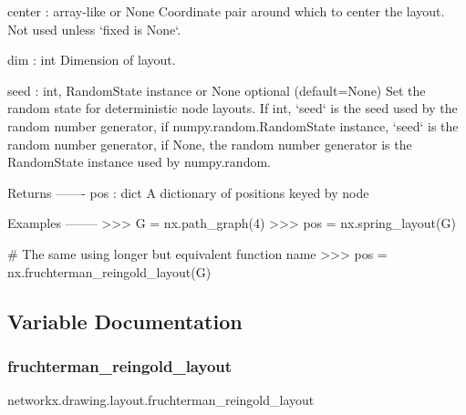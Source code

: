 \begin{DoxyVerb}
center : array-like or None
    Coordinate pair around which to center the layout.
    Not used unless `fixed is None`.

dim : int
    Dimension of layout.

seed : int, RandomState instance or None  optional (default=None)
    Set the random state for deterministic node layouts.
    If int, `seed` is the seed used by the random number generator,
    if numpy.random.RandomState instance, `seed` is the random
    number generator,
    if None, the random number generator is the RandomState instance used
    by numpy.random.

Returns
-------
pos : dict
    A dictionary of positions keyed by node

Examples
--------
>>> G = nx.path_graph(4)
>>> pos = nx.spring_layout(G)

# The same using longer but equivalent function name
>>> pos = nx.fruchterman_reingold_layout(G)
\end{DoxyVerb}
 

\subsection{Variable Documentation}
\mbox{\label{namespacenetworkx_1_1drawing_1_1layout_a0778ce3d6875858bcd5f59b42f87ebff}} 
\subsubsection{\texorpdfstring{fruchterman\+\_\+reingold\+\_\+layout}{fruchterman\_reingold\_layout}}
{\footnotesize\ttfamily networkx.\+drawing.\+layout.\+fruchterman\+\_\+reingold\+\_\+layout}


